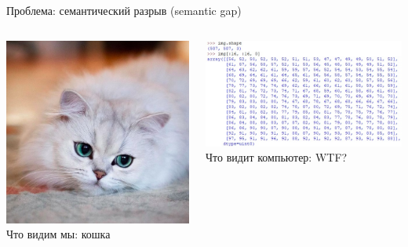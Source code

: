 \documentclass[aspectratio=169, professionalfonts]{beamer}
\begin{document}
\begin{frame}{Проблема: семантический разрыв (semantic gap)}
    \begin{columns}
        \begin{column}{.35\linewidth}
            \centering
            \includegraphics[width=\linewidth]{graphs/fig8.jpg}
            Что видим мы: кошка
        \end{column}
        \pause
        \begin{column}{.65\linewidth}
            \centering
            \includegraphics[width=\linewidth]{graphs/fig10.jpg}
            Что видит компьютер: WTF?
        \end{column}
    \end{columns}
\end{frame}
\end{document}
